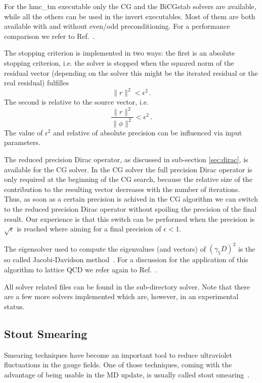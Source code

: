 For the {\ttfamily hmc\_tm} executable only the CG and the BiCGstab
solvers are available, while all the others can be used in the
{\ttfamily invert} executables. Most of them are both available with
and without even/odd preconditioning. For a performance comparison we
refer to Ref.~\cite{Chiarappa:2004ry,Chiarappa:2006hz}.

The stopping criterion is implemented in two ways: the first is an
absolute stopping criterion, i.e. the solver is stopped when the
squared norm of the residual vector (depending on the solver this
might be the iterated residual or the real residual) fulfilles
\[
\|r\|^2 < \epsilon^2\, .
\]
The second is relative to the source vector, i.e.
\[
\frac{\|r\|^2}{\|\phi\|^2} < \epsilon^2\, .
\]
The value of $\epsilon^2$ and relative of absolute precision can be
influenced via input parameters.

The reduced precision Dirac operator, as discussed in sub-section
\ref{sec:dirac}, is available for the CG solver. In the CG solver the 
full precision Dirac operator is only required at the beginning of the
CG search, because the relative size of the contribution to the
resulting vector decreases with the number of iterations. Thus, as soon
as a certain precision is achived in the CG algorithm we can switch to
the reduced precision Dirac operator without spoiling the precision of
the final result. Our experience is that this switch can be performed
when the precision is $\sqrt{\epsilon}$ is reached where aiming for a
final precision of $\epsilon < 1$.

The eigensolver used to compute the eigenvalues (and vectors) of
$(\gamma_5 D)^2$ is the so called Jacobi-Davidson 
method~\cite{Sleijpen:1996aa,Geus:2002}. For a discussion for the
application of this algorithm to lattice QCD we refer again to
Ref.~\cite{Chiarappa:2004ry,Chiarappa:2006hz}. 

All solver related files can be found in the sub-directory {\ttfamily
  solver}. Note that there are a few more solvers implemented which
are, however, in an experimental status.

\subsection{Stout Smearing}

Smearing techniques have become an important tool to reduce
ultraviolet fluctuations in the gauge fields. One of those techniques,
coming with the advantage of being usable in the MD update, is usually
called stout smearing~\cite{Morningstar:2003gk}. 

